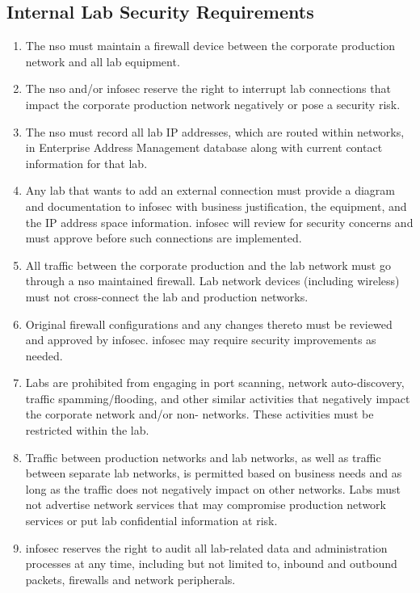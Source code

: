 \subsection{Internal Lab Security Requirements}
\begin{enumerate}
\item
The \gls{nso} must maintain a firewall device between the corporate production network and all lab equipment.
\item
The \gls{nso} and/or \gls{infosec} reserve the right to interrupt lab connections that impact the corporate production network negatively or pose a security risk.
\item
The \gls{nso} must record all lab IP addresses, which are routed within \CompanyName{} networks, in Enterprise Address Management database along with current contact information for that lab.
\item
Any lab that wants to add an external connection must provide a diagram and documentation to \gls{infosec} with business justification, the equipment, and the IP address space information.  
\gls{infosec} will review for security concerns and must approve before such connections are implemented.
\item
All traffic between the corporate production and the lab network must go through a \gls{nso} maintained firewall.  
Lab network devices (including wireless) must not cross-connect the lab and production networks.
\item
Original firewall configurations and any changes thereto must be reviewed and approved by \gls{infosec}.  
\gls{infosec} may require security improvements as needed.
\item
Labs are prohibited from engaging in port scanning, network auto-discovery, traffic spamming/flooding, and other similar activities that negatively impact the corporate network and/or non-\CompanyName{} networks.  
These activities must be restricted within the lab.
\item
Traffic between production networks and lab networks, as well as traffic between separate lab networks, is permitted based on business needs and as long as the traffic does not negatively impact on other networks.  
Labs must not advertise network services that may compromise production network services or put lab confidential information at risk.
\item
\gls{infosec} reserves the right to audit all lab-related data and administration processes at any time, including but not limited to, inbound and outbound packets, firewalls and network peripherals.

\end{enumerate}
